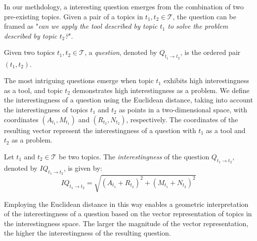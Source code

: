 In our methdology, a interesting question emerges from the combination of two pre-existing topics. Given a pair of a topics in $t_1, t_2 \in \mathcal{T}$, the question can be framed as "\emph{can we apply the tool described by topic $t_1$ to solve the problem described by topic $t_2$?}".

\begin{definition}
Given two topics $t_1, t_2 \in \mathcal{T}$, a \emph{question}, denoted by $Q_{t_1 \rightarrow t_2}$, is the ordered pair $\left(t_1, t_2\right)$.
\end{definition}

The most intriguing questions emerge when topic $t_1$ exhibits high interestingness as a tool, and topic $t_2$ demonstrates high interestingness as a problem. We define the interestingness of a question using the Euclidean distance, taking into account the interestingness of topics $t_1$ and $t_2$ as points in a two-dimensional space, with coordinates $(A_{t_1}, M_{t_1})$ and $(R_{t_2}, N_{t_2})$, respectively. The coordinates of the resulting vector represent the interestingness of a question with $t_1$ as a tool and $t_2$ as a problem.

\begin{definition}
Let $t_1$ and $t_2 \in \mathcal{T}$ be two topics. The \emph{interestingness} of the question $Q_{t_1 \rightarrow t_2}$, denoted by $IQ_{t_1 \rightarrow t_2}$, is given by:
\[
IQ_{t_1 \rightarrow t_2} = \sqrt{ (A_{t_1} + R_{t_2})^2 + (M_{t_1} + N_{t_2})^2 }
\]
\end{definition}

Employing the Euclidean distance in this way enables a geometric interpretation of the interestingness of a question based on the vector representation of topics in the interestingness space. The larger the magnitude of the vector representation, the higher the interestingness of the resulting question.



